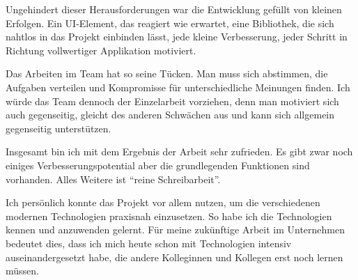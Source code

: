 Ungehindert dieser Herausforderungen war die Entwicklung gefüllt von kleinen Erfolgen.
Ein UI-Element, das reagiert wie erwartet,
eine Bibliothek, die sich nahtlos in das Projekt einbinden lässt,
jede kleine Verbesserung, jeder Schritt in Richtung vollwertiger Applikation motiviert.

Das Arbeiten im Team hat so seine Tücken.
Man muss sich abstimmen, die Aufgaben verteilen und Kompromisse für unterschiedliche Meinungen finden.
Ich würde das Team dennoch der Einzelarbeit vorziehen, denn man motiviert sich auch gegenseitig,
gleicht des anderen Schwächen aus und kann sich allgemein gegenseitig unterstützen.

Insgesamt bin ich mit dem Ergebnis der Arbeit sehr zufrieden.
Es gibt zwar noch einiges Verbesserungspotential aber die grundlegenden Funktionen sind vorhanden.
Alles Weitere ist \enquote{reine Schreibarbeit}.

Ich persönlich konnte das Projekt vor allem nutzen, um die verschiedenen modernen Technologien praxisnah einzusetzen.
So habe ich die Technologien kennen und anzuwenden gelernt.
Für meine zukünftige Arbeit im Unternehmen bedeutet dies,
dass ich mich heute schon mit Technologien intensiv auseinandergesetzt habe,
die andere Kolleginnen und Kollegen erst noch lernen müssen.
